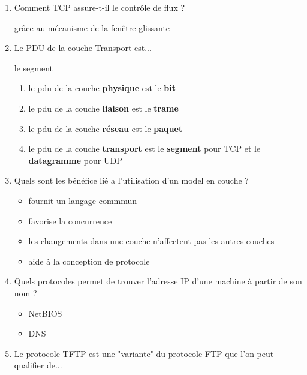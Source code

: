 \documentclass[a4paper]{article}
\begin{document}
\begin{enumerate}
    \item Comment TCP assure-t-il le contrôle de flux ?
    \begin{example}
        grâce au mécanisme de la fenêtre glissante
    \end{example}
    \item Le PDU de la couche Transport est...
    \begin{example}
        le segment
        \begin{enumerate}
            \item le pdu de la couche \textbf{physique} est le \textbf{bit}
            \item le pdu de la couche \textbf{liaison} est le \textbf{trame}
            \item le pdu de la couche \textbf{réseau} est le \textbf{paquet}
            \item le pdu de la couche \textbf{transport} est le \textbf{segment} pour TCP et le \textbf{datagramme} pour UDP
        \end{enumerate}
    \end{example}
    \item Quels sont les bénéfice lié a l’utilisation d’un model en couche ?
    \begin{example}
        \begin{itemize}
            \item fournit un langage commmun
            \item favorise la concurrence
            \item les changements dans une couche n'affectent pas les autres couches
            \item aide à la conception de protocole
        \end{itemize}
    \end{example}
    \item Quels protocoles permet de trouver l’adresse IP d’une machine à partir de son nom ?
    \begin{example}
        \begin{itemize}
            \item NetBIOS
            \item DNS
        \end{itemize}
    \end{example}
    \item Le protocole TFTP est une "variante" du protocole FTP que l’on peut qualifier de...
    \begin{example}

\end{example}
\end{enumerate}
\end{document}
